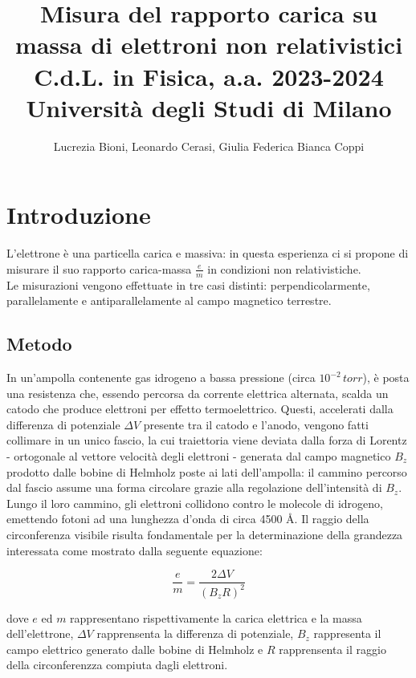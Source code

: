 \documentclass[]{article}
\title{%
    \Huge Misura del rapporto carica su massa di elettroni non relativistici \\
    \Large C.d.L. in Fisica, a.a. 2023-2024 \\ Università degli Studi di Milano}
\author{\LARGE Lucrezia Bioni, Leonardo Cerasi, Giulia Federica Bianca Coppi}
\date{}
\let\oldsection\section%
\renewcommand{\section}{%
	\renewcommand{\theequation}{\thesection.\arabic{equation}}%
	\oldsection}%
\let\oldsubsection\subsection%
\renewcommand{\subsection}{%
	\renewcommand{\theequation}{\thesubsection.\arabic{equation}}%
	\oldsubsection}%
\begin{document}
    \maketitle

    \section{Introduzione}

    L'elettrone è una particella carica e massiva: in questa esperienza ci si propone di misurare il suo rapporto carica-massa $ \frac{e}{m} $ in condizioni non relativistiche. \\
    Le misurazioni vengono effettuate in tre casi distinti: perpendicolarmente, parallelamente e antiparallelamente al campo magnetico terrestre.


    \subsection{Metodo}

    In un'ampolla contenente gas idrogeno a bassa pressione (circa $ 10^{-2}\, torr $), è posta una resistenza che, essendo percorsa da corrente elettrica alternata, scalda un catodo che produce elettroni per effetto termoelettrico. 
    Questi, accelerati dalla differenza di potenziale $\Delta V$ presente tra il catodo e l'anodo, vengono fatti collimare in un unico fascio, la cui traiettoria viene deviata dalla forza di Lorentz - ortogonale al vettore velocità degli elettroni - generata dal campo magnetico $ B_z $ prodotto dalle bobine di Helmholz poste ai lati dell'ampolla: il cammino percorso dal fascio assume una forma circolare grazie alla regolazione dell'intensità di $B_z$. \\

    Lungo il loro cammino, gli elettroni collidono contro le molecole di idrogeno, emettendo fotoni ad una lunghezza d'onda di circa 4500 Å.
    Il raggio della circonferenza visibile risulta fondamentale per la determinazione della grandezza interessata come mostrato dalla seguente equazione:

    \begin{equation}
        \label{e_m}
        \frac{e}{m} = \frac{2 \Delta V}{(B_z R)^2}
    \end{equation}

    dove $ e $ ed $ m $ rappresentano rispettivamente la carica elettrica e la massa dell'elettrone, $\Delta V$ rapprensenta la differenza di potenziale, $B_z$ rappresenta il campo elettrico generato dalle bobine di Helmholz e $ R $ rapprensenta il raggio della circonferenzza compiuta dagli elettroni. \\
\end{document}
